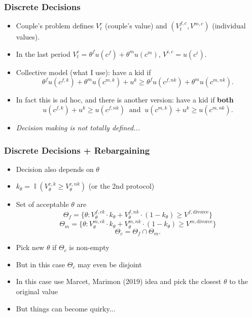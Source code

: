 \documentclass{beamer}
\DeclareMathOperator{\I}{\mathbb{I}}
\begin{document}
\begin{frame}
\frametitle{Discrete Decisions}
\begin{itemize}
\item Couple's problem defines $V^{c}_t$ (couple's value) and $(V^{f,c}_t,V^{m,c})$ (individual values).
\item In the last period $V^{c}_t = \theta^f u(c^f) + \theta^m u(c^m)$, $V^{i,c} = u(c^i)$.
\item Collective model (what I use): have a kid if 
\[ \theta^f u(c^{f,k}) + \theta^m u(c^{m,k})  + u^{k} \geq \theta^f u(c^{f,nk}) + \theta^m u(c^{m,nk}).\]
\item In fact this is ad hoc, and there is another version: have a kid if \textbf{both}
\[ u(c^{f,k}) + u^{k} \geq u(c^{f,nk})  \ \text{ and } \ u(c^{m,k}) + u^{k} \geq u(c^{m,nk}).\]
\item \textit{Decision making is not totally defined...}
\end{itemize}
\end{frame}



\begin{frame}
\frametitle{Discrete Decisions + Rebargaining}
\begin{itemize}
\item Decision also depends on $\theta$
\item $k_\theta = \I(V^{c,k}_\theta \geq V^{c,nk}_\theta)$ (or the 2nd protocol)
\item Set of acceptable $\theta$ are
\[ \Theta_f =  \{ \theta : V^{f,ck}_\theta \cdot k_\theta  + V^{f,nk}_\theta \cdot  (1-k_\theta ) \geq V^{f,\text{divorce}} \}\]
\[ \Theta_m = \{ \theta : V^{m,ck}_\theta  \cdot  k_\theta+ V^{m,nk}_\theta  \cdot  (1-k_\theta ) \geq V^{m,\text{divorce}} \}\]
\[ \Theta_c = \Theta_f \cap \Theta_m.\]
\item Pick new $\theta$ if $\Theta_c$ is non-empty
\item But in this case $\Theta_c$ may even be disjoint
\item In this case use Marcet, Marimon (2019) idea and pick the closest $\theta$ to the original value
\item But things can become quirky...
\end{itemize}
\end{frame}
\end{document}
